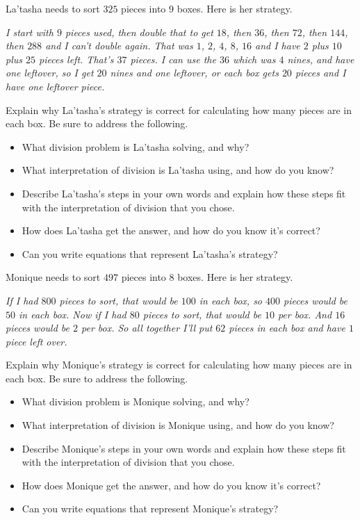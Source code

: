 \documentclass[nooutcomes,noauthor]{ximera}
\begin{document}
\begin{problem}
La'tasha needs to sort $325$ pieces into $9$ boxes. Here is her strategy.

\emph{I start with $9$ pieces used, then double that to get $18$, then $36$, then $72$, then $144$, then $288$ and I can't double again. That was $1$, $2$, $4$, $8$, $16$ and I have $2$ plus $10$ plus $25$ pieces left. That's $37$ pieces. I can use the $36$ which was $4$ nines, and have one leftover, so I get $20$ nines and one leftover, or each box gets $20$ pieces and I have one leftover piece.}

Explain why La'tasha's strategy is correct for calculating how many pieces are in each box. Be sure to address the following.
\begin{itemize}
	\item What division problem is La'tasha solving, and why?
	\item What interpretation of division is La'tasha using, and how do you know?
	\item Describe La'tasha's  steps in your own words and explain how these steps fit with the interpretation of division that you chose.
	\item How does La'tasha get the answer, and how do you know it's correct?
	\item Can you write equations that represent La'tasha's strategy?
\end{itemize}
\end{problem}




\begin{problem}
Monique needs to sort $497$ pieces into $8$ boxes. Here is her strategy.

\emph{If I had $800$ pieces to sort, that would be $100$ in each box, so $400$ pieces would be $50$ in each box. Now if I had $80$ pieces to sort, that would be $10$ per box. And $16$ pieces would be $2$ per box. So all together I'll put $62$ pieces in each box and have $1$ piece left over.}

Explain why Monique's strategy is correct for calculating how many pieces are in each box. Be sure to address the following.
\begin{itemize}
	\item What division problem is Monique solving, and why?
	\item What interpretation of division is Monique using, and how do you know?
	\item Describe Monique's  steps in your own words and explain how these steps fit with the interpretation of division that you chose.
	\item How does Monique get the answer, and how do you know it's correct?
	\item Can you write equations that represent Monique's strategy?
\end{itemize}
\end{problem}
\end{document}
